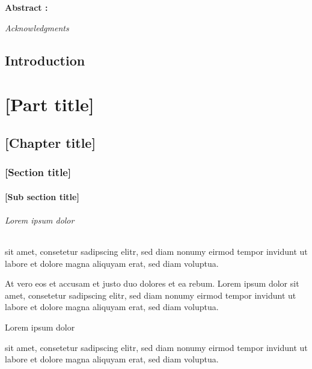 \documentclass[12pt,a4paper]{book}
\begin{document}



\newpage
\noindent 
\textbf{Abstract :}
\vskip 1cm




\newpage
\emph{Acknowledgments}


\lipsum[1]


\tableofcontents

\listoffigures


\listoftables




\chapter*{Introduction}

\lipsum[1-2]

\part{[Part title]}

\chapter{[Chapter title]}

\section{[Section title]}

\lipsum[1]

\subsection{[Sub section title]}

\lipsum[1]

\paragraph{Lorem ipsum dolor} sit amet, consetetur sadipscing elitr, sed diam nonumy eirmod tempor invidunt ut labore et dolore magna aliquyam erat, sed diam voluptua. 

At vero eos et accusam et justo duo dolores et ea rebum. Lorem ipsum dolor sit amet, consetetur sadipscing elitr, sed diam nonumy eirmod tempor invidunt ut labore et dolore magna aliquyam erat, sed diam voluptua.

\subparagraph{Lorem ipsum dolor} sit amet, consetetur sadipscing elitr, sed diam nonumy eirmod tempor invidunt ut labore et dolore magna aliquyam erat, sed diam voluptua. 
\end{document}
